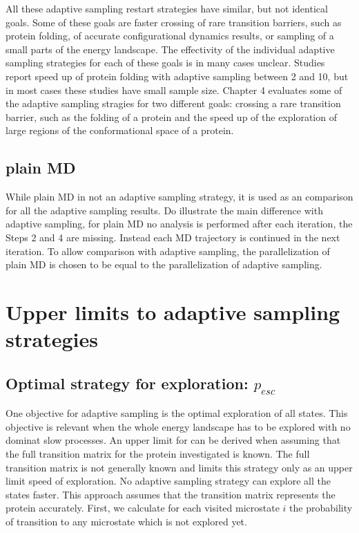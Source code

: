 All these adaptive sampling restart strategies have similar, but not identical goals.
Some of these goals are faster crossing of rare transition barriers, such as protein folding, of accurate configurational dynamics results, or sampling of a small parts of the energy landscape.
The effectivity of the individual adaptive sampling strategies for each of these goals is in many cases unclear. Studies \cite{preto2014fast,weber2011characterization,bowman2010enhanced,Fabritiis-2014} report speed up of protein folding with adaptive sampling between 2 and 10, but in most cases these studies have small sample size. Chapter 4 evaluates some of the adaptive sampling stragies for two different goals: crossing a rare transition barrier, such as the folding of a protein and the speed up of  the exploration of large regions of the conformational space of a protein.

\subsection{plain MD} 

While plain MD in not an adaptive sampling strategy, it is used as an comparison for all the adaptive sampling results. Do illustrate the main difference with adaptive sampling, for plain MD no analysis is performed after each iteration, the Steps 2 and 4 are missing. Instead each MD trajectory is continued in the next iteration. To allow comparison with adaptive sampling, the parallelization of plain MD is chosen to be equal to the parallelization of adaptive sampling.  

\section{Upper limits to adaptive sampling strategies}

\subsection{Optimal strategy for exploration: $p_{esc}$}

One objective for adaptive sampling is the optimal exploration of all states. This objective is relevant when the whole energy landscape has to be explored with no dominat slow processes. 
An upper limit for can be derived when assuming that the full transition matrix for the protein investigated is known. The full transition matrix is not generally known and limits this strategy only as an upper limit speed of exploration. No adaptive sampling strategy can explore all the states faster. This approach assumes that the transition matrix represents the protein accurately.
First, we calculate for each visited microstate $i$ the probability of transition to any microstate which is not explored yet.

